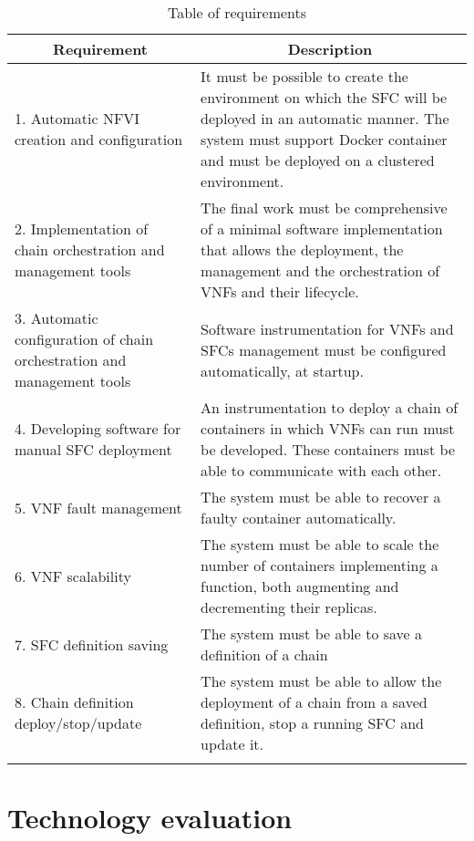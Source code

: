 \begin{longtable}[c]{p{}p{}}
\hline
\multicolumn{1}{c}{\textbf{Requirement}}                               &
\multicolumn{1}{c}{\textbf{Description}}                               \\ \hline
\endhead
%
\hline
\endfoot
%
\endlastfoot
%
1. Automatic NFVI creation and configuration &
It must be possible to create the environment on which the SFC will be deployed
in an automatic manner. The system must support Docker container and must be
deployed on a clustered environment. \\
2. Implementation of chain orchestration and management tools &
The final work must be comprehensive of a minimal software implementation that
allows the deployment, the management and the orchestration of VNFs and their
lifecycle. \\
3. Automatic configuration of chain orchestration and management tools &
Software instrumentation for VNFs and SFCs management must be configured
automatically, at startup. \\
4. Developing software for manual SFC deployment &
An instrumentation to deploy a chain of containers in which VNFs can run must
be developed. These containers must be able to communicate with each
other. \\
5. VNF fault management &
The system must be able to recover a faulty container automatically. \\
6. VNF scalability &
The system must be able to scale the number of containers implementing a
function, both augmenting and decrementing their replicas. \\
7. SFC definition saving &
The system must be able to save a definition of a chain \\
8. Chain definition deploy/stop/update & The system must be able to allow the
deployment of a chain from a saved definition, stop a running SFC and update
it. \\
\hline
\caption{Table of requirements}
\label{chap:prjan:tab:req}\\
\end{longtable}

\section{Technology evaluation}


